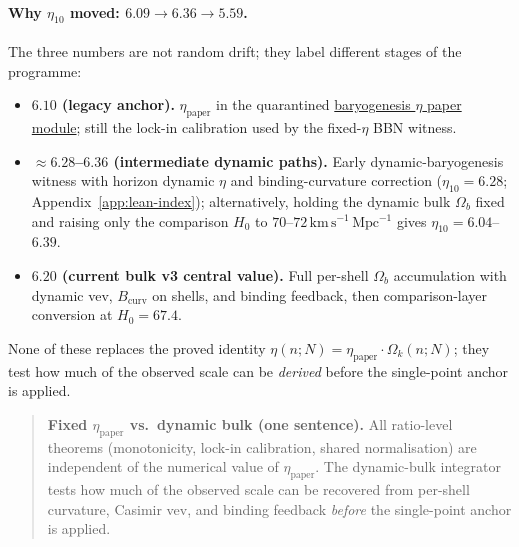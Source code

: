 \documentclass[11pt]{amsart}
\newcommand{\LeanEng}[2]{\hyperref[#1]{#2}}
\newenvironment{summarybox}{%
  \medskip\begin{quote}\small
}{%
  \end{quote}\medskip
}
\begin{document}
\paragraph{Why $\eta_{10}$ moved: $6.09\to 6.36\to 5.59$.}
The three numbers are not random drift; they label different stages of
the programme:
\begin{itemize}[leftmargin=2em]
\item \textbf{$6.10$ (legacy anchor).}
  $\eta_{\mathrm{paper}}$ in the quarantined
  \LeanEng{lean:eta-paper}{baryogenesis $\eta$ paper module}; still the
  lock-in calibration used by the fixed-$\eta$ BBN witness.
\item \textbf{$\approx 6.28$--$6.36$ (intermediate dynamic paths).}
  Early dynamic-baryogenesis witness with horizon dynamic $\eta$ and
  binding-curvature correction ($\eta_{10}=6.28$; Appendix~\ref{app:lean-index});
  alternatively, holding the dynamic bulk
  $\Omega_b$ fixed and raising only the comparison $H_0$ to
  $70$--$72\,\mathrm{km\,s^{-1}\,Mpc^{-1}}$ gives
  $\eta_{10}=6.04$--$6.39$.
\item \textbf{$6.20$ (current bulk v3 central value).}
  Full per-shell $\Omega_b$ accumulation with dynamic vev, $B_{\mathrm{curv}}$
  on shells, and binding feedback, then comparison-layer conversion at
  $H_0=67.4$.
\end{itemize}
None of these replaces the proved identity
$\eta(n;N)=\eta_{\mathrm{paper}}\cdot\Omega_k(n;N)$; they test how much
of the observed scale can be \emph{derived} before the single-point
anchor is applied.

\begin{summarybox}
\noindent\textbf{Fixed $\eta_{\mathrm{paper}}$ vs.\ dynamic bulk (one sentence).}
All ratio-level theorems (monotonicity, lock-in calibration, shared
normalisation) are independent of the numerical value of
$\eta_{\mathrm{paper}}$. The dynamic-bulk integrator tests how much of
the observed scale can be recovered from per-shell curvature, Casimir
vev, and binding feedback \emph{before} the single-point anchor is applied.
\end{summarybox}
\end{document}
